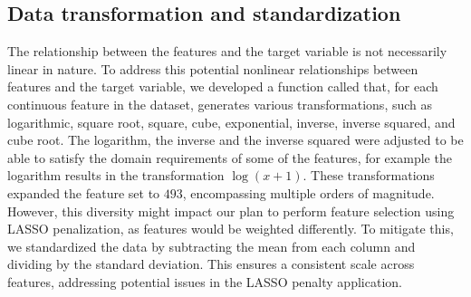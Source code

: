 \documentclass[hidelinks,12pt]{article}
\newcommand{\inlinecode}[1]{%
    \tikz[baseline=(text.base)]{
        \node[inner sep=2pt, fill=gray!15, rounded corners, font=\ttfamily](text){#1};
    }%
}
\begin{document}
\subsection{Data transformation and standardization}
The relationship between the features and the target variable is not necessarily linear in nature. To address this potential nonlinear relationships between features and the target variable, we developed a function called \inlinecode{transformations()} that, for each continuous feature in the dataset, generates various transformations, such as logarithmic, square root, square, cube, exponential, inverse, inverse squared, and cube root. The logarithm, the inverse and the inverse squared were adjusted to be able to satisfy the domain requirements of some of the features, for example the logarithm results in the transformation $\log(x+1)$. These transformations expanded the feature set to $493$, encompassing multiple orders of magnitude.\\
However, this diversity might impact our plan to perform feature selection using LASSO penalization, as features would be weighted differently. To mitigate this, we standardized the data by subtracting the mean from each column and dividing by the standard deviation. This ensures a consistent scale across features, addressing potential issues in the LASSO penalty application.
\end{document}
